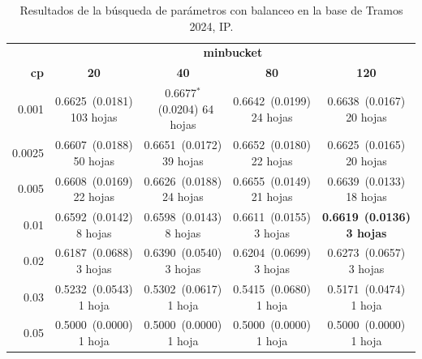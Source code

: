 \documentclass[twoside,a4paper,12pt,onecolumn,openany]{book}
\begin{document}
\begin{table}[H]
\centering
\small
\setlength{\tabcolsep}{4pt}
\begin{tabular}{r|cccc}
\toprule
 & \multicolumn{4}{c}{\textbf{minbucket}} \\
\cmidrule(lr){2-5}
\textbf{cp} & \textbf{20} & \textbf{40} & \textbf{80} & \textbf{120} \\
\midrule
0.001 & \shortstack{0.6625~(0.0181)\\ 103 hojas} & \shortstack{0.6677$^{*}$~(0.0204)\\ 64 hojas} & \shortstack{0.6642~(0.0199)\\ 24 hojas} & \shortstack{0.6638~(0.0167)\\ 20 hojas} \\[4pt]
0.0025 & \shortstack{0.6607~(0.0188)\\ 50 hojas} & \shortstack{0.6651~(0.0172)\\ 39 hojas} & \shortstack{0.6652~(0.0180)\\ 22 hojas} & \shortstack{0.6625~(0.0165)\\ 20 hojas} \\[4pt]
0.005 & \shortstack{0.6608~(0.0169)\\ 22 hojas} & \shortstack{0.6626~(0.0188)\\ 24 hojas} & \shortstack{0.6655~(0.0149)\\ 21 hojas} & \shortstack{0.6639~(0.0133)\\ 18 hojas} \\[4pt]
0.01 & \shortstack{0.6592~(0.0142)\\ 8 hojas} & \shortstack{0.6598~(0.0143)\\ 8 hojas} & \shortstack{0.6611~(0.0155)\\ 3 hojas} & \shortstack{\textbf{0.6619}~\textbf{(0.0136)}\\ \textbf{3 hojas}} \\[4pt]
0.02 & \shortstack{0.6187~(0.0688)\\ 3 hojas} & \shortstack{0.6390~(0.0540)\\ 3 hojas} & \shortstack{0.6204~(0.0699)\\ 3 hojas} & \shortstack{0.6273~(0.0657)\\ 3 hojas} \\[4pt]
0.03 & \shortstack{0.5232~(0.0543)\\ 1 hoja} & \shortstack{0.5302~(0.0617)\\ 1 hoja} & \shortstack{0.5415~(0.0680)\\ 1 hoja} & \shortstack{0.5171~(0.0474)\\ 1 hoja} \\[4pt]
0.05 & \shortstack{0.5000~(0.0000)\\ 1 hoja} & \shortstack{0.5000~(0.0000)\\ 1 hoja} & \shortstack{0.5000~(0.0000)\\ 1 hoja} & \shortstack{0.5000~(0.0000)\\ 1 hoja} \\[4pt]
\bottomrule
\end{tabular}
\caption{Resultados de la búsqueda de parámetros con balanceo en la base de Tramos 2024, IP.}
\label{tab:busqueda_ip_2024}
\end{table}
 
\end{document}
